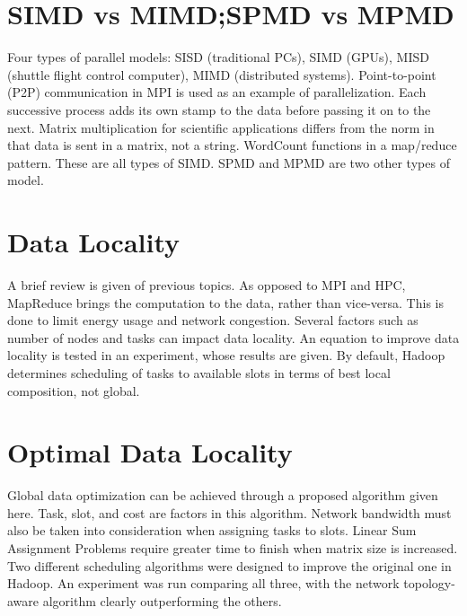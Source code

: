 \section{SIMD vs MIMD;SPMD vs MPMD}

Four types of parallel models: SISD (traditional PCs), SIMD (GPUs), MISD
(shuttle flight control computer), MIMD (distributed systems).
Point-to-point (P2P) communication in MPI is used as an example of
parallelization. Each successive process adds its own stamp to the data
before passing it on to the next. Matrix multiplication for scientific
applications differs from the norm in that data is sent in a matrix, not
a string. WordCount functions in a map/reduce pattern. These are all
types of SIMD. SPMD and MPMD are two other types of model.



\section{Data Locality}

A brief review is given of previous topics. As opposed to MPI and HPC,
MapReduce brings the computation to the data, rather than vice-versa.
This is done to limit energy usage and network congestion. Several
factors such as number of nodes and tasks can impact data locality. An
equation to improve data locality is tested in an experiment, whose
results are given. By default, Hadoop determines scheduling of tasks to
available slots in terms of best local composition, not global.



\section{Optimal Data Locality}

Global data optimization can be achieved through a proposed algorithm
given here. Task, slot, and cost are factors in this algorithm. Network
bandwidth must also be taken into consideration when assigning tasks to
slots. Linear Sum Assignment Problems require greater time to finish
when matrix size is increased. Two different scheduling algorithms were
designed to improve the original one in Hadoop. An experiment was run
comparing all three, with the network topology-aware algorithm clearly
outperforming the others.

